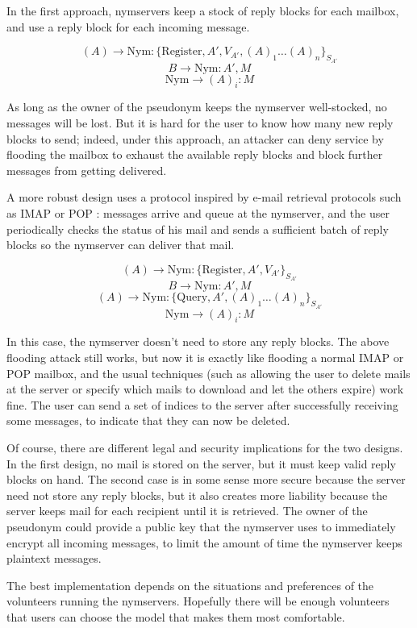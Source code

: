 \documentclass[11pt]{IEEEtran}
\begin{document}
In the first approach, nymservers keep a stock of reply blocks for
each mailbox, and use a reply block for each incoming message. 

\[(A) \rightarrow \mathrm{Nym}: \{\mathrm{Register} ,A', V_{A'}, (A)_1 \dots
(A)_n\}_{S_{A'}}\]
\[B \rightarrow \mathrm{Nym}: A', M\]
\[\mathrm{Nym} \rightarrow (A)_i: M\]

As long
as the owner of the pseudonym keeps the nymserver well-stocked, no
messages will be lost.  But it is hard for the user to know how many
new reply blocks to send; indeed, under this approach, an attacker can
deny service by flooding the mailbox to exhaust the available
reply blocks and block further messages from getting delivered.

A more robust design uses a protocol inspired by e-mail retrieval
protocols such as IMAP \cite{IMAP} or POP \cite{POP3}:
messages arrive and queue at the nymserver, and the user periodically
checks the status of his mail and sends a sufficient batch of reply
blocks so the nymserver can deliver that mail.

\[(A) \rightarrow \mathrm{Nym}: \{\mathrm{Register} ,A', V_{A'}\}_{S_{A'}}\]
\[B \rightarrow \mathrm{Nym}: A', M\]
\[(A) \rightarrow \mathrm{Nym}: \{\mathrm{Query} ,A', (A)_1 \dots
(A)_n\}_{S_{A'}}\]
\[\mathrm{Nym} \rightarrow (A)_i: M\]

In this case, the nymserver doesn't need to store any reply blocks.
The above flooding attack still works, but now it is exactly
like flooding a normal IMAP or POP mailbox, and the usual techniques (such as
allowing the user to delete mails at the server or specify which mails to
download and let the others expire) work fine. The user can send a set
of indices to the server after successfully receiving
some messages, to indicate that they can now be deleted.

Of course, there are different legal and security implications for the two
designs. In the first design, no mail is stored on the server, but it must
keep valid reply blocks on hand. The second case is in some sense more
secure because the server need not store any reply blocks, but it also
creates more liability because the server keeps mail for each recipient
until it is retrieved. The owner of the pseudonym could provide a public
key that the nymserver uses to immediately encrypt all incoming messages,
to limit the amount of time the nymserver keeps plaintext messages.

The best implementation depends on the situations and preferences of
the volunteers running the nymservers. Hopefully there will be enough
volunteers that users can choose the model that makes them most
comfortable.
\end{document}
